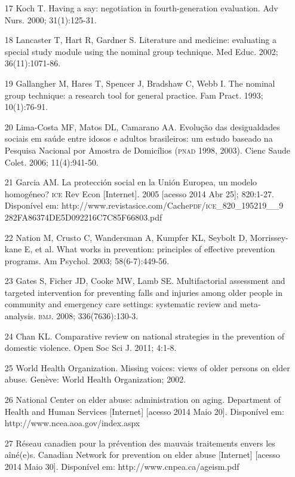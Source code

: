\documentclass{article}
\begin{document}
\begin{itemize}
\item[17] Koch T. Having a say: negotiation in fourth-generation evaluation. Adv
Nurs. 2000; 31(1):125-31.

\item[18] Lancaster T, Hart R, Gardner S. Literature and medicine: evaluating a
special study module using the nominal group technique. Med Educ. 2002;
36(11):1071-86.

\item[19] Gallangher M, Hares T, Spencer J, Bradshaw C, Webb I. The nominal
group technique: a research tool for general practice. Fam Pract. 1993;
10(1):76-91.

\item[20] Lima-Costa MF, Matos DL, Camarano AA. Evolução das desigualdades
sociais em saúde entre idosos e adultos brasileiros: um estudo baseado na
Pesquisa Nacional por Amostra de Domicílios (\textsc{pnad} 1998, 2003). Cienc Saude
Colet. 2006; 11(4):941-50.

\item[21] Garcia AM. La protección social en la Unión Europea, un modelo
homogéneo? \textsc{ice} Rev Econ [Internet]. 2005 [acesso 2014 Abr 25]; 820:1-27.
Disponível em: http://www.revistasice.com/Cache\textsc{pdf}/\textsc{ice}\_{}820\_{}195219\_{}\_{}9
282FA86374DE5D092216C7C85F66803.pdf

\item[22] Nation M, Crusto C, Wandersman A, Kumpfer KL, Seybolt D,
Morrissey-kane E, et al. What works in prevention: principles of effective
prevention programs. Am Psychol. 2003; 58(6-7):449-56.

\item[23] Gates S, Ficher JD, Cooke MW, Lamb SE. Multifactorial assessment and
targeted intervention for preventing falls and injuries among older people in
community and emergency care settings: systematic review and meta-analysis. \textsc{bmj}.
2008; 336(7636):130-3.

\item[24] Chan KL. Comparative review on national strategies in the prevention
of domestic violence. Open Soc Sci J. 2011; 4:1-8.

\item[25] World Health Organization. Missing voices: views of older persons on
elder abuse. Genève: World Health Organization; 2002.

\item[26] National Center on elder abuse: administration on aging. Department of
Health and Human Services [Internet] [acesso 2014 Maio 20]. Disponível em:
http://www.ncea.aoa.gov/index.aspx

\item[27] Réseau canadien pour la prévention des mauvais traitements envers les
aîné(e)s. Canadian Network for prevention on elder abuse [Internet] [acesso 2014
Maio 30]. Disponível em: http://www.cnpea.ca/ageism.pdf

\end{itemize}
\end{document}
